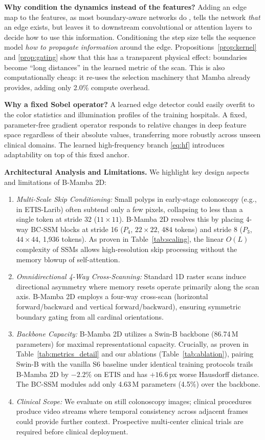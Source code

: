 \documentclass[journal]{IEEEtran}
\begin{document}
\textbf{Why condition the dynamics instead of the features?} Adding an edge map to the features, as most boundary-aware networks do \cite{fan2020pranet,bui2024meganet}, tells the network \emph{that} an edge exists, but leaves it to downstream convolutional or attention layers to decide how to use this information. Conditioning the step size tells the sequence model \emph{how to propagate information} around the edge. Propositions~\ref{prop:kernel} and \ref{prop:gating} show that this has a transparent physical effect: boundaries become ``long distances'' in the learned metric of the scan. This is also computationally cheap: it re-uses the selection machinery that Mamba already provides, adding only 2.0\% compute overhead.

\textbf{Why a fixed Sobel operator?} A learned edge detector could easily overfit to the color statistics and illumination profiles of the training hospitals. A fixed, parameter-free gradient operator responds to relative changes in deep feature space regardless of their absolute values, transferring more robustly across unseen clinical domains. The learned high-frequency branch \eqref{eq:hf} introduces adaptability on top of this fixed anchor.

\textbf{Architectural Analysis and Limitations.} We highlight key design aspects and limitations of B-Mamba 2D:
\begin{enumerate}
  \item \emph{Multi-Scale Skip Conditioning:} Small polyps in early-stage colonoscopy (e.g., in ETIS-Larib) often subtend only a few pixels, collapsing to less than a single token at stride 32 ($11\times11$). B-Mamba 2D resolves this by placing 4-way BC-SSM blocks at stride 16 ($P_4$, $22\times22$, 484 tokens) and stride 8 ($P_3$, $44\times44$, 1,936 tokens). As proven in Table~\ref{tab:scaling}, the linear $O(L)$ complexity of SSMs allows high-resolution skip processing without the memory blowup of self-attention.
  \item \emph{Omnidirectional 4-Way Cross-Scanning:} Standard 1D raster scans induce directional asymmetry where memory resets operate primarily along the scan axis. B-Mamba 2D employs a four-way cross-scan (horizontal forward/backward and vertical forward/backward), ensuring symmetric boundary gating from all cardinal orientations.
  \item \emph{Backbone Capacity:} B-Mamba 2D utilizes a Swin-B backbone (86.74\,M parameters) for maximal representational capacity. Crucially, as proven in Table~\ref{tab:metrics_detail} and our ablations (Table~\ref{tab:ablation}), pairing Swin-B with the vanilla S6 baseline under identical training protocols trails B-Mamba 2D by $-2.2\%$ on ETIS and has $+16.6$\,px worse Hausdorff distance. The BC-SSM modules add only 4.63\,M parameters (4.5\%) over the backbone.
  \item \emph{Clinical Scope:} We evaluate on still colonoscopy images; clinical procedures produce video streams where temporal consistency across adjacent frames could provide further context. Prospective multi-center clinical trials are required before clinical deployment.
\end{enumerate}
\end{document}
